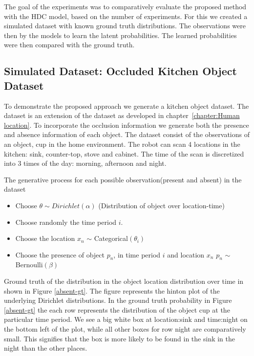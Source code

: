 The goal of the experiments was to comparatively evaluate the proposed method with the HDC model, based on the number of experiments. For this we created a simulated dataset with known ground truth distributions. The observations were then by the models to learn the latent probabilities. The learned probabilities were then compared with the ground truth. 

\subsection{Simulated Dataset: Occluded Kitchen Object Dataset}

To demonstrate the proposed approach we generate a kitchen object dataset. The dataset is an extension of the dataset as developed in chapter~\ref{chapter:Human location}. To incorporate the occlusion information we generate both the presence and absence information of each object. The dataset consist of the observations of an object, cup in the home environment. The robot can scan 4 locations in the kitchen: sink, counter-top, stove and cabinet. The time of the scan is discretized into 3 times of the day: morning, afternoon and night. 

The generative process for each possible observation(present and absent) in the dataset 
\begin{itemize}
    \item Choose $ \theta \sim Dirichlet(\alpha)$ (Distribution of object over location-time)
    \item Choose randomly the time period $i$.
	\item Choose the location $x_n$ $\sim$ Categorical$(\theta_i)$
	\item Choose the presence of object $p_n$, in time period $i$ and location $x_n$  $p_n$ $\sim$ Bernoulli$(\beta) $
\end{itemize}

Ground truth of the distribution in the object location distribution over time in shown in Figure \ref{absent-gt}. The figure represents the hinton plot of the underlying Dirichlet distributions. In the ground truth probability in Figure \ref{absent-gt} the each row represents the distribution of the object cup at the particular time period. We see a big white box at location:sink and time:night on the bottom left of the plot, while all other boxes for row night are comparatively small. This signifies that the box is more likely to be found in the sink in the night than the other places.


